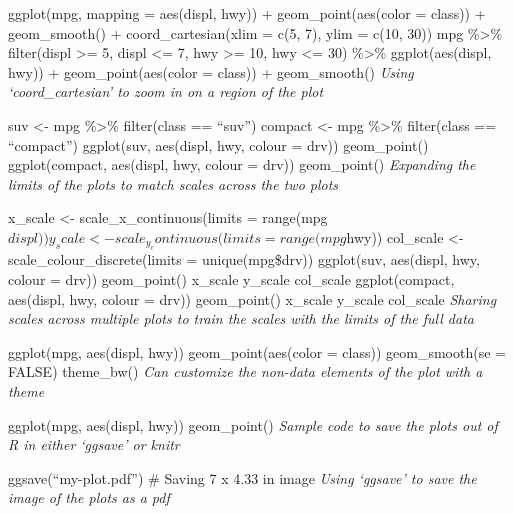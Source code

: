 \documentclass[
]{article}
\begin{document}
ggplot(mpg, mapping = aes(displ, hwy)) + geom\_point(aes(color = class))
+ geom\_smooth() + coord\_cartesian(xlim = c(5, 7), ylim = c(10, 30))
mpg \%\textgreater\% filter(displ \textgreater= 5, displ \textless= 7,
hwy \textgreater= 10, hwy \textless= 30) \%\textgreater\%
ggplot(aes(displ, hwy)) + geom\_point(aes(color = class)) +
geom\_smooth() \emph{Using `coord\_cartesian' to zoom in on a region of
the plot}

suv \textless- mpg \%\textgreater\% filter(class == ``suv'') compact
\textless- mpg \%\textgreater\% filter(class == ``compact'') ggplot(suv,
aes(displ, hwy, colour = drv)) geom\_point() ggplot(compact, aes(displ,
hwy, colour = drv)) geom\_point() \emph{Expanding the limits of the
plots to match scales across the two plots}

x\_scale \textless- scale\_x\_continuous(limits =
range(mpg\(displ)) y_scale <- scale_y_continuous(limits = range(mpg\)hwy))
col\_scale \textless- scale\_colour\_discrete(limits = unique(mpg\$drv))
ggplot(suv, aes(displ, hwy, colour = drv)) geom\_point() x\_scale
y\_scale col\_scale ggplot(compact, aes(displ, hwy, colour = drv))
geom\_point() x\_scale y\_scale col\_scale \emph{Sharing scales across
multiple plots to train the scales with the limits of the full data}

ggplot(mpg, aes(displ, hwy)) geom\_point(aes(color = class))
geom\_smooth(se = FALSE) theme\_bw() \emph{Can customize the non-data
elements of the plot with a theme}

ggplot(mpg, aes(displ, hwy)) geom\_point() \emph{Sample code to save the
plots out of R in either `ggsave' or knitr}

ggsave(``my-plot.pdf'') \# Saving 7 x 4.33 in image \emph{Using `ggsave'
to save the image of the plots as a pdf}
\end{document}
